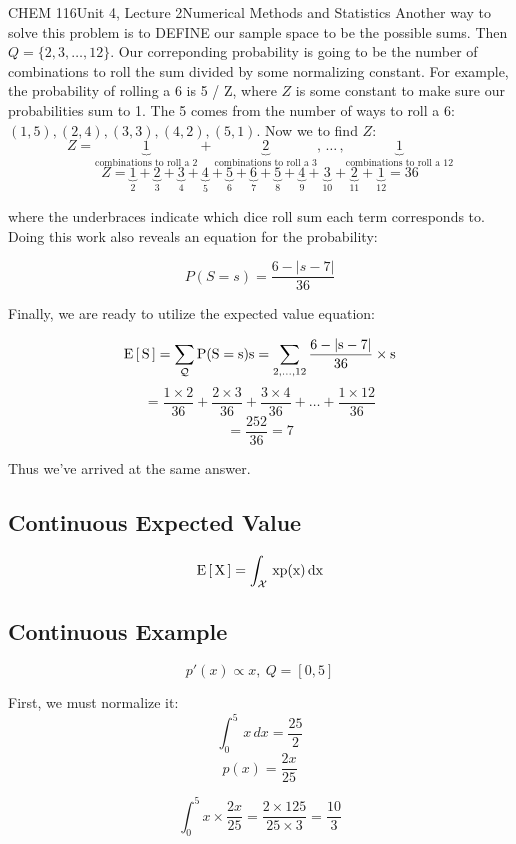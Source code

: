 \documentclass{article}
\begin{document}
\begin{tdoc}{CHEM 116}{Unit 4, Lecture 2}{Numerical Methods and Statistics}
Another way to solve this problem is to DEFINE our sample space to be
the possible sums. Then $Q = \{2, 3, \ldots, 12\}$. Our correponding
probability is going to be the number of combinations to roll the sum
divided by some normalizing constant. For example, the probability of
rolling a 6 is 5 / Z, where $Z$ is some constant to make sure our
probabilities sum to 1. The 5 comes from the number of ways to roll a
6: $(1, 5), (2, 4), (3, 3), (4, 2), (5, 1)$. Now we to find $Z$:
\[
Z = \underbrace{1}_{\textrm{combinations to roll a 2}} + \underbrace{2}_{\textrm{combinations to roll a 3}},\, \ldots\,, \underbrace{1}_{\textrm{combinations to roll a 12}}
\]
\[
Z = \underbrace{1}_2 + \underbrace{2}_3 + \underbrace{3}_4 + \underbrace{4}_5 + \underbrace{5}_6 + \underbrace{6}_7 + \underbrace{5}_8 + \underbrace{4}_9 + \underbrace{3}_{10} + \underbrace{2}_{11} + \underbrace{1}_{12} = 36
\]

where the underbraces indicate which dice roll sum each term corresponds
to. Doing this work also reveals an equation for the probability:

\[
P(S = s) = \frac{6 - |s - 7|}{36}
\]

Finally, we are ready to utilize the expected value equation:

\[
\rm{E}\left[\,S\,\right] = \sum_\mathcal{Q} P(S=s)s = \sum_{2,\ldots,12} \frac{6 - |s - 7|}{36}\times s
\]
\[
= \frac{1 \times 2}{36} + \frac{2 \times 3}{36} + \frac{3 \times 4}{36} + \ldots + \frac{1 \times 12}{36}
\]
\[
= \frac{252}{36} = 7
\]

Thus we've arrived at the same answer.

\subsection{Continuous Expected Value}

\begin{equation}
\rm{E}\left[\,X\,\right] = \int_\mathcal{X}\,xp(x)\,dx
\end{equation}


\subsection{Continuous Example}
\[
p'(x) \propto x,\:  Q = [0,5]
\]

First, we must normalize it:
\[
\int_0^5 \,x\,dx = \frac{25}{2}
\]
\[
p(x) = \frac{2x}{25}
\]

\[
\int_0^5 x\times\frac{2x}{25} = \frac{2\times 125}{25\times 3} = \frac{10}{3}
\]


\end{tdoc}
\end{document}
